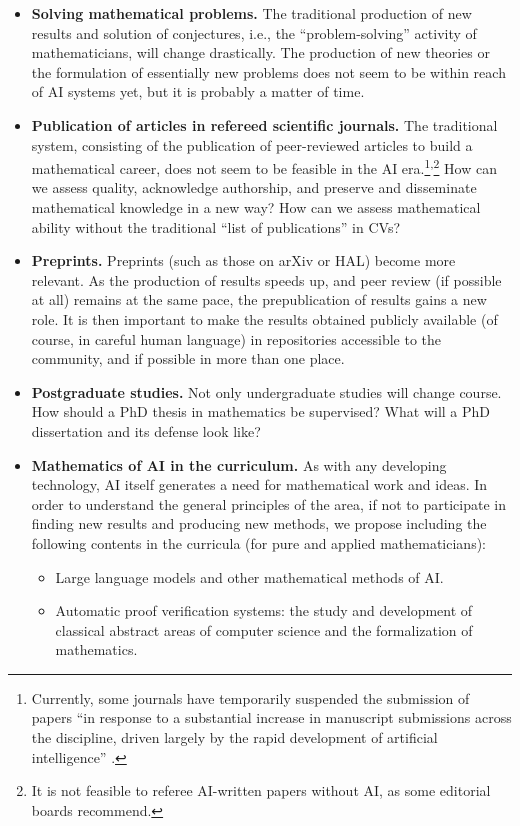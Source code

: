 \documentclass[12pt]{article}
\begin{document}
\begin{itemize}
\item\textbf{Solving mathematical problems.} The traditional production of new results and solution of conjectures, i.e., the ``problem-solving'' activity of mathematicians, will change drastically. The production of new theories or the formulation of essentially new problems does not seem to be within reach of AI systems yet, but it is probably a matter of time.
\item\textbf{Publication of articles in refereed scientific journals.}
The traditional system, consisting of the publication of peer-reviewed articles to build a mathematical career, does not seem to be feasible in the AI era.\footnote{Currently, some journals have temporarily suspended the submission of papers ``in response to a substantial increase in manuscript submissions across the discipline, driven largely by the rapid development of artificial intelligence'' \cite{esaim}.}\textsuperscript{,}\footnote{It is not feasible to referee AI-written papers without AI, as some editorial boards recommend.}
How can we assess quality, acknowledge authorship, and preserve and disseminate mathematical knowledge in a new way?
How can we assess mathematical ability without the traditional ``list of publications'' in CVs?
\item\textbf{Preprints.} Preprints (such as those on arXiv or HAL) become more relevant.
As the production of results speeds up, and peer review (if possible at all) remains at the same pace,
the prepublication of results gains a new role. It is then important to make the results obtained publicly available
(of course, in careful human language) in repositories accessible to the community, and if possible in more than one place.
\item\textbf{Postgraduate studies.} Not only undergraduate studies will change course.
How should a PhD thesis in mathematics be supervised? What will a PhD dissertation and its defense look like?
\item\textbf{Mathematics of AI in the curriculum.}
As with any developing technology, AI itself generates a need for mathematical work and ideas.
In order to understand the general principles of the area, if not to participate in finding new results and producing new methods, we propose including the following contents in the curricula (for pure and applied mathematicians):
\begin{itemize}
\item Large language models and other mathematical methods of AI.
\item Automatic proof verification systems: the study and development of classical abstract areas of computer science and the formalization of mathematics.

\end{itemize}
\end{itemize}
\end{document}
